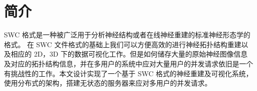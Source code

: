 \chapter{简介}

 SWC 格式是一种被广泛用于分析神经结构或者在线神经重建的标准神经形态学的格式。 在 SWC 文件格式的基础上我们可以方便高效的进行神经拓扑结构重建以及相应的 2D，3D 下的数据可视化工作。但是如何储存大量的原始神经图像信息及对应的拓扑结构信息，并在多用户的系统中应对大量用户的并发请求依旧是一个有挑战性的工作。本文设计实现了一个基于 SWC 格式的神经重建及可视化系统，使用分布式的架构，搭建无状态的服务器来应对多用户的并发请求。